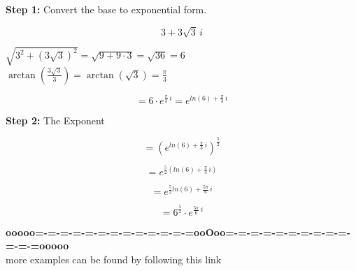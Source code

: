 \documentclass{ximera}
\begin{document}
\textbf{\textcolor{blue!55!black}{Step 1:}} Convert the base to exponential form.


\[
3 + 3\sqrt{3} \, i
\]


$\sqrt{3^2 + (3\sqrt{3})^2} = \sqrt{9 + 9 \cdot 3} = \sqrt{36} = 6$ \\

$\arctan\left( \frac{3\sqrt{3}}{3}  \right) = \arctan\left( \sqrt{3}  \right) = \frac{\pi}{3}$



\[
= 6 \cdot e^{\tfrac{\pi}{3} \, i} = e^{ln(6) + \tfrac{\pi}{3} \, i}
\]



\textbf{\textcolor{blue!55!black}{Step 2:}} The Exponent



\[
= \left( e^{ln(6) + \tfrac{\pi}{3} \, i} \right)^{\tfrac{5}{2}} 
\]


\[
= e^{\tfrac{5}{2} (ln(6) + \tfrac{\pi}{3} \, i)}
\]



\[
= e^{\tfrac{5}{2} ln(6) + \tfrac{5\pi}{6} \, i}
\]


\[
= 6^{\tfrac{5}{2}} \cdot e^{\tfrac{5\pi}{6} \, i}
\]









\begin{center}
\textbf{\textcolor{green!50!black}{ooooo=-=-=-=-=-=-=-=-=-=-=-=-=ooOoo=-=-=-=-=-=-=-=-=-=-=-=-=ooooo}} \\

more examples can be found by following this link\\ 

\end{center}
\end{document}

